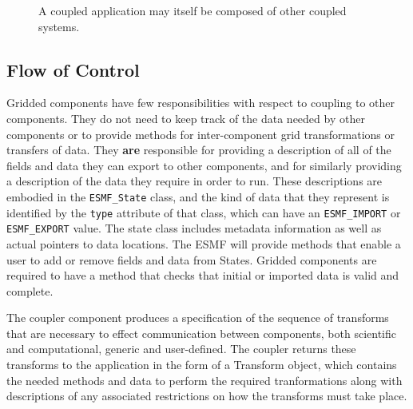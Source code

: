 \begin{figure}
\caption[{Scoping of Components in a Coupled Application}]{A coupled
application may itself be composed of other coupled systems.}
\label{fig:couplerscaling}
\end{figure}

\subsection{Flow of Control}

Gridded components have few responsibilities with respect to coupling
to other components.  They do not need to keep track of the data needed
by other components or to provide methods for inter-component 
grid transformations or transfers of data.  They {\bf are} responsible for 
providing a description of all of the fields and data they
can export to other components, and for similarly providing a description 
of the data they require in order to run.  These descriptions are
embodied in the {\tt ESMF\_State} class, and the kind of data that they 
represent is identified by the {\tt type} attribute of that class, which can
have an {\tt ESMF\_IMPORT} or {\tt ESMF\_EXPORT} value.  The state class
includes metadata information as well as actual pointers to data 
locations.  The ESMF will provide methods that enable a user to add or
remove fields and data from States.  Gridded components are required to 
have a method that checks that initial or imported data is valid and 
complete.  

The coupler component produces a specification of the sequence of 
transforms that are necessary to effect communication between components, 
both scientific and computational, generic and user-defined.  The coupler 
returns these transforms to the application in the form of a Transform
object, which contains the needed methods and data to perform the
required tranformations along with descriptions of any
associated restrictions on how the transforms must take place.

